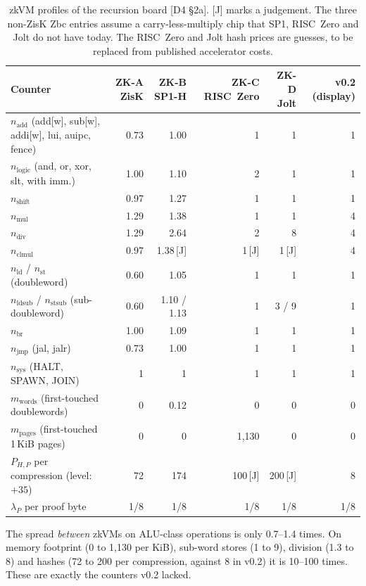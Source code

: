\begin{table}[t]
\centering\footnotesize
\setlength{\tabcolsep}{4pt}
\begin{tabular}{@{}lrrrrr@{}}
\toprule
Counter & ZK-A ZisK & ZK-B SP1-H & ZK-C RISC~Zero & ZK-D Jolt & v0.2 (display) \\
\midrule
$n_{\mathrm{add}}$ (add[w], sub[w], addi[w], lui, auipc, fence) & 0.73 & 1.00 & 1 & 1 & 1 \\
$n_{\mathrm{logic}}$ (and, or, xor, slt, with imm.) & 1.00 & 1.10 & 2 & 1 & 1 \\
$n_{\mathrm{shift}}$ & 0.97 & 1.27 & 1 & 1 & 1 \\
$n_{\mathrm{mul}}$ & 1.29 & 1.38 & 1 & 1 & 4 \\
$n_{\mathrm{div}}$ & 1.29 & 2.64 & 2 & 8 & 4 \\
$n_{\mathrm{clmul}}$ & 0.97 & 1.38\,[J] & 1\,[J] & 1\,[J] & 4 \\
$n_{\mathrm{ld}}$ / $n_{\mathrm{st}}$ (doubleword) & 0.60 & 1.05 & 1 & 1 & 1 \\
$n_{\mathrm{ldsub}}$ / $n_{\mathrm{stsub}}$ (sub-doubleword) & 0.60 & 1.10 / 1.13 & 1 & 3 / 9 & 1 \\
$n_{\mathrm{br}}$ & 1.00 & 1.09 & 1 & 1 & 1 \\
$n_{\mathrm{jmp}}$ (jal, jalr) & 0.73 & 1.00 & 1 & 1 & 1 \\
$n_{\mathrm{sys}}$ (HALT, SPAWN, JOIN) & 1 & 1 & 1 & 1 & 1 \\
$m_{\mathrm{words}}$ (first-touched doublewords) & 0 & 0.12 & 0 & 0 & 0 \\
$m_{\mathrm{pages}}$ (first-touched 1\,KiB pages) & 0 & 0 & 1{,}130 & 0 & 0 \\
$P_{H,P}$ per compression (level: $+35$) & 72 & 174 & 100\,[J] & 200\,[J] & 8 \\
$\lambda_P$ per proof byte & 1/8 & 1/8 & 1/8 & 1/8 & 1/8 \\
\bottomrule
\end{tabular}
\caption{zkVM profiles of the recursion board [D4 §2a]. [J] marks a judgement. The three
non-ZisK Zbc entries assume a carry-less-multiply chip that SP1, RISC~Zero and Jolt do not have today.
The RISC~Zero and Jolt hash prices are guesses, to be replaced from published accelerator costs.}
\label{tab:cost-profiles}
\end{table}

The spread \emph{between} zkVMs on ALU-class operations is only 0.7--1.4 times. On memory footprint
(0 to 1{,}130 per KiB), sub-word stores (1 to 9), division (1.3 to 8) and hashes (72 to 200 per
compression, against 8 in v0.2) it is 10--100 times. These are exactly the counters v0.2 lacked.

